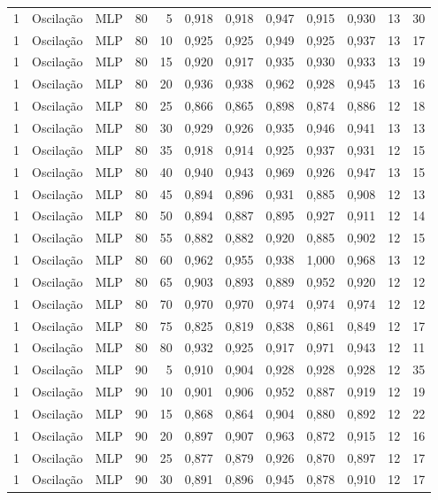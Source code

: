 \begin{longtable}{@{}rllrrrrrrrrr@{}}
1 & Oscilação & MLP & 80 & 5 & 0,918 & 0,918 & 0,947 & 0,915 & 0,930 & 13 & 30 \\
1 & Oscilação & MLP & 80 & 10 & 0,925 & 0,925 & 0,949 & 0,925 & 0,937 & 13 & 17 \\
1 & Oscilação & MLP & 80 & 15 & 0,920 & 0,917 & 0,935 & 0,930 & 0,933 & 13 & 19 \\
1 & Oscilação & MLP & 80 & 20 & 0,936 & 0,938 & 0,962 & 0,928 & 0,945 & 13 & 16 \\
1 & Oscilação & MLP & 80 & 25 & 0,866 & 0,865 & 0,898 & 0,874 & 0,886 & 12 & 18 \\
1 & Oscilação & MLP & 80 & 30 & 0,929 & 0,926 & 0,935 & 0,946 & 0,941 & 13 & 13 \\
1 & Oscilação & MLP & 80 & 35 & 0,918 & 0,914 & 0,925 & 0,937 & 0,931 & 12 & 15 \\
1 & Oscilação & MLP & 80 & 40 & 0,940 & 0,943 & 0,969 & 0,926 & 0,947 & 13 & 15 \\
1 & Oscilação & MLP & 80 & 45 & 0,894 & 0,896 & 0,931 & 0,885 & 0,908 & 12 & 13 \\
1 & Oscilação & MLP & 80 & 50 & 0,894 & 0,887 & 0,895 & 0,927 & 0,911 & 12 & 14 \\
1 & Oscilação & MLP & 80 & 55 & 0,882 & 0,882 & 0,920 & 0,885 & 0,902 & 12 & 15 \\
1 & Oscilação & MLP & 80 & 60 & 0,962 & 0,955 & 0,938 & 1,000 & 0,968 & 13 & 12 \\
1 & Oscilação & MLP & 80 & 65 & 0,903 & 0,893 & 0,889 & 0,952 & 0,920 & 12 & 12 \\
1 & Oscilação & MLP & 80 & 70 & 0,970 & 0,970 & 0,974 & 0,974 & 0,974 & 12 & 12 \\
1 & Oscilação & MLP & 80 & 75 & 0,825 & 0,819 & 0,838 & 0,861 & 0,849 & 12 & 17 \\
1 & Oscilação & MLP & 80 & 80 & 0,932 & 0,925 & 0,917 & 0,971 & 0,943 & 12 & 11 \\
1 & Oscilação & MLP & 90 & 5 & 0,910 & 0,904 & 0,928 & 0,928 & 0,928 & 12 & 35 \\
1 & Oscilação & MLP & 90 & 10 & 0,901 & 0,906 & 0,952 & 0,887 & 0,919 & 12 & 19 \\
1 & Oscilação & MLP & 90 & 15 & 0,868 & 0,864 & 0,904 & 0,880 & 0,892 & 12 & 22 \\
1 & Oscilação & MLP & 90 & 20 & 0,897 & 0,907 & 0,963 & 0,872 & 0,915 & 12 & 16 \\
1 & Oscilação & MLP & 90 & 25 & 0,877 & 0,879 & 0,926 & 0,870 & 0,897 & 12 & 17 \\
1 & Oscilação & MLP & 90 & 30 & 0,891 & 0,896 & 0,945 & 0,878 & 0,910 & 12 & 17 \\

\end{longtable}
